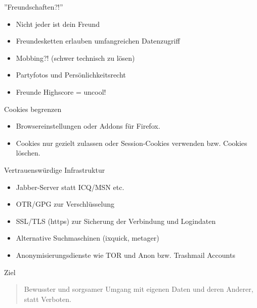 \begin{frame}{''Freundschaften?!''}
	\begin{itemize}
		\item Nicht jeder ist dein Freund
		\item Freundesketten erlauben umfangreichen Datenzugriff
		\item Mobbing?! (schwer technisch zu l\"osen)
		\item Partyfotos und Pers\"onlichkeitsrecht
		\item Freunde Highscore = uncool!
	\end{itemize}
\end{frame}


\begin{frame}{Cookies begrenzen}
	\begin{itemize}
		\item Browsereinstellungen oder Addons f\"ur Firefox.
		\item Cookies nur gezielt zulassen oder Session-Cookies verwenden bzw. Cookies l\"oschen.
	\end{itemize}
\end{frame}

\begin{frame}{Vertrauenswürdige Infrastruktur}
	\begin{itemize}
		\item Jabber-Server statt ICQ/MSN etc.
		\item OTR/GPG zur Verschl\"usselung
		\item SSL/TLS (https) zur Sicherung der Verbindung und Logindaten
		\item Alternative Suchmaschinen (ixquick, metager)
		\item Anonymisierungsdienste wie TOR und Anon bzw. Trashmail Accounts
	\end{itemize}
\end{frame}

\begin{frame}{Ziel}
	\begin{quotation}
		Bewusster und sorgsamer Umgang mit eigenen Daten und deren Anderer, statt Verboten.
	\end{quotation}
\end{frame}


